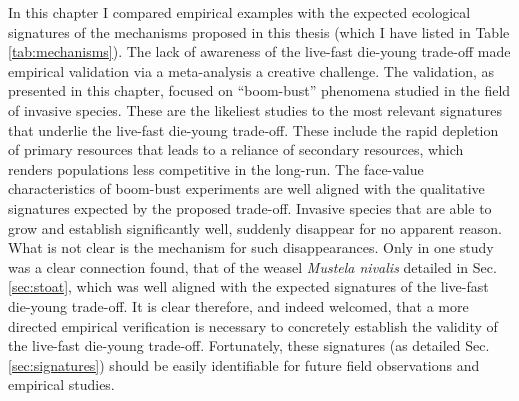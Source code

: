 \documentclass[a4paper]{report}
\begin{document}
In this chapter I compared empirical examples with the expected ecological signatures of the mechanisms proposed in this thesis (which I have listed in Table \ref{tab:mechanisms}). The lack of awareness of the live-fast die-young trade-off made empirical validation via a meta-analysis a creative challenge. The validation, as presented in this chapter, focused on “boom-bust” phenomena studied in the field of invasive species. These are the likeliest studies to the most relevant signatures that underlie the live-fast die-young trade-off. These include the rapid depletion of primary resources that leads to a reliance of secondary resources, which renders populations less competitive in the long-run. The face-value characteristics of boom-bust experiments are well aligned with the qualitative signatures expected by the proposed trade-off. Invasive species that are able to grow and establish significantly well, suddenly disappear for no apparent reason. What is not clear is the mechanism for such disappearances. Only in one study was a clear connection found, that of the weasel \textit{Mustela nivalis} detailed in Sec. \ref{sec:stoat}, which was well aligned with the expected signatures of the live-fast die-young trade-off. It is clear therefore, and indeed welcomed, that a more directed empirical verification is necessary to concretely establish the validity of the live-fast die-young trade-off. Fortunately, these signatures (as detailed Sec. \ref{sec:signatures}) should be easily identifiable for future field observations and empirical studies. \\
\end{document}
